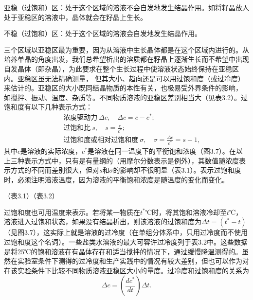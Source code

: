 亚稳（过饱和）区：处于这个区域的溶液不会自发地发生结晶作用。如将籽晶放人处于亚稳区的溶液中，晶体就会在籽晶上生长。

不稳（过饱和）区：处于这个区域的溶液会自发地发生结晶作用。

三个区域以亚稳区最为重要，因为从溶液中生长晶体都是在这个区域内进行的。从培养单晶的角度出发，我们总希望析出的溶质都在籽晶上逐渐生长而不希望中出现自发晶体（即杂晶），为此要求在整个生长过程中使溶液状态始终保持在亚稳区内。亚稳区虽无法精确测量， 但其大小、趋向还是可以用过饱和度（或过冷度）来估计的。亚稳区的大小既同结晶物质的本性有关，也极易受外界条件的影响， 如搅拌、振动、温度、杂质等。不同物质溶液的亚稳区差别相当大（见表3.2）。过饱和度有以下几种表示方式：
\begin{eqnarray}
&& \text{浓度驱动力}\ \Delta c,\quad\Delta c=c-c^*; \\
&& \text{过饱和比}\ s,\quad s=\frac{c}{c^*}; \\
&& \text{过饱和度或相对过饱和度}\ \sigma,\quad\sigma=\frac{\Delta c}{c^*}=s-1,
\end{eqnarray}
其中$c$是溶液的实际浓度，$c^*$是溶液在同一温度下的平衡饱和浓度（图3.7）。在以上三种表示方式中，只有是有量纲的（用摩尔分数表示是例外），其数值随浓度表示方式的不同而差别很大，但对$s$和$\sigma$的影响却不很明显（表3.1）。表示过饱和度时，必须注明溶液温度，因为溶液的平衡饱和浓度是随温度的变化而变化。

（表3.1）（表3.2）

过饱和度也可用温度来表示。若将某一物质在$t^*$℃时，将其饱和溶液冷却至$t$℃，溶液进入过饱和状态，如果没有结晶析出，则该溶液的过饱和度为$\Delta t=(t^*-t)$（见图3.7），这实际上就是溶液的过冷度（在单组分体系中，只用过冷度而不使用过饱和度这个名词）。一些盐类水溶液的最大可容许过冷度列于表3.2中。这些数据是将25℃的饱和溶液在有晶体存在和适当搅拌的情况下，通过缓慢降温测得的。虽然在实验室条件下测得的过冷度和生产实践中的情况有较大差别，但也可以作为对在该实验条件下比较不同物质溶液亚稳区大小的量度。过冷度和过饱和度的关系为
\begin{equation}
\Delta c = \left(\frac{dc^*}{dt}\right)\Delta t.
\end{equation}
